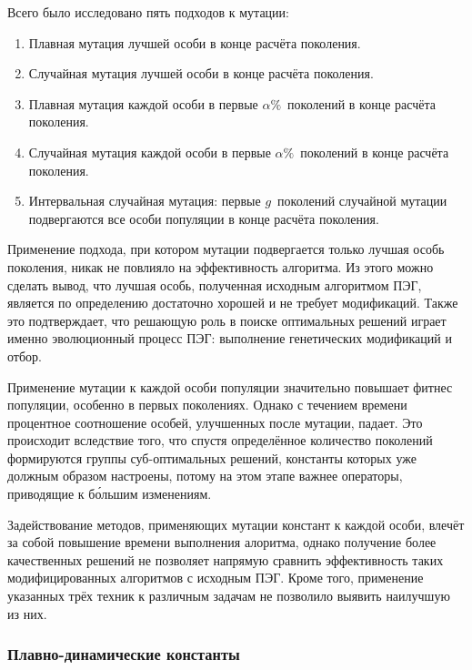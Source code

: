 Всего было исследовано пять подходов к мутации:
\begin{enumerate} \itemsep0pt \parskip0pt 
  \item Плавная мутация лучшей особи в конце расчёта поколения.
  \item Случайная мутация лучшей особи в конце расчёта поколения.
  \item Плавная мутация каждой особи в первые $\alpha\%$~поколений в конце расчёта поколения.
  \item Случайная мутация каждой особи в первые $\alpha\%$~поколений в конце расчёта поколения.
  \item Интервальная случайная мутация: первые $g$~поколений случайной мутации подвергаются все особи популяции в конце расчёта поколения.
\end{enumerate}

Применение подхода, при котором мутации подвергается только лучшая особь поколения, никак не повлияло на эффективность алгоритма. Из этого можно сделать вывод, что лучшая особь, полученная исходным алгоритмом ПЭГ, является по определению достаточно хорошей и не требует модификаций. Также это подтверждает, что решающую роль в поиске оптимальных решений играет именно эволюционный процесс ПЭГ: выполнение генетических модификаций и отбор.

Применение мутации к каждой особи популяции значительно повышает фитнес популяции, особенно в первых поколениях. Однако с течением времени процентное соотношение особей, улучшенных после мутации, падает. Это происходит вследствие того, что спустя определённое количество поколений формируются группы суб-оптимальных решений, константы которых уже должным образом настроены, потому на этом этапе важнее операторы, приводящие к б\'{о}льшим изменениям.

Задействование методов, применяющих мутации констант к каждой особи, влечёт за собой повышение времени выполнения алоритма, однако получение более качественных решений не позволяет напрямую сравнить эффективность таких модифицированных алгоритмов с исходным ПЭГ. Кроме того, применение указанных трёх техник к различным задачам не позволило выявить наилучшую из них.


\subsubsection{Плавно-динамические константы}


